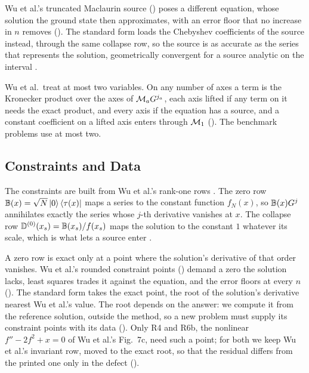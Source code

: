 Wu et al.'s truncated Maclaurin source () poses a different equation, whose solution the ground state then approximates, with an error floor that no increase in $n$ removes (). The standard form loads the Chebyshev coefficients of the source instead, through the same collapse row, so the source is as accurate as the series that represents the solution, geometrically convergent for a source analytic on the interval \cite{trefethen2013approximation}.

Wu et al.\ treat at most two variables. On any number of axes a term is the Kronecker product over the axes of $\mathcal{M}_{a}G^{j_a}$, each axis lifted if any term on it needs the exact product, and every axis if the equation has a source, and a constant coefficient on a lifted axis enters through $\mathcal{M}_1$ (). The benchmark problems use at most two.

\subsection{Constraints and Data}
\label{sec:standard-constraints}

The constraints are built from Wu et al.'s rank-one rows \cite{wu2025pihm}. The zero row $\mathbb{B}(x)=\sqrt{N}\ket{0}\bra{\tau(x)}$ maps a series to the constant function $f_N(x)$, so $\mathbb{B}(x)G^{j}$ annihilates exactly the series whose $j$-th derivative vanishes at $x$. The collapse row $\mathbb{D}^{(0)}(x_s)=\mathbb{B}(x_s)/f(x_s)$ maps the solution to the constant $1$ whatever its scale, which is what lets a source enter .

A zero row is exact only at a point where the solution's derivative of that order vanishes. Wu et al.'s rounded constraint points () demand a zero the solution lacks, least squares trades it against the equation, and the error floors at every $n$ (). The standard form takes the exact point, the root of the solution's derivative nearest Wu et al.'s value. The root depends on the answer: we compute it from the reference solution, outside the method, so a new problem must supply its constraint points with its data (). Only R4 and R6b, the nonlinear $f''-2f^2+x=0$ of Wu et al.'s Fig.~7c, need such a point; for both we keep Wu et al.'s invariant row, moved to the exact root, so that the residual differs from the printed one only in the defect ().

